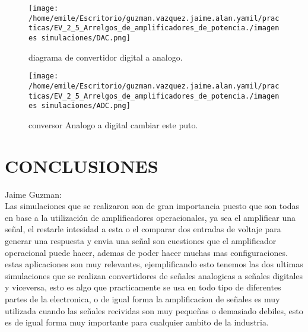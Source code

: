 \documentclass[13pt]{article}
\begin{document}
\begin{figure}[htp]
\centering
\texttt{[image: /home/emile/Escritorio/guzman.vazquez.jaime.alan.yamil/practicas/EV\_2\_5\_Arrelgos\_de\_amplificadores\_de\_potencia./imagenes simulaciones/DAC.png]}
\caption{diagrama de convertidor digital a analogo.}
\label{.}
\end{figure}


\begin{figure}[htp]
\centering
\texttt{[image: /home/emile/Escritorio/guzman.vazquez.jaime.alan.yamil/practicas/EV\_2\_5\_Arrelgos\_de\_amplificadores\_de\_potencia./imagenes simulaciones/ADC.png]}
\caption{conversor Analogo a digital cambiar este puto.}
\label{.}
\end{figure}






















\section{CONCLUSIONES}
Jaime Guzman:\\
Las simulaciones que se realizaron son de gran importancia puesto que son todas en base a la utilización de amplificadores operacionales, ya sea el amplificar una señal, el restarle intesidad  a esta o el comparar dos entradas de voltaje para generar una respuesta y envia una señal son cuestiones que el amplificador operacional puede hacer, ademas de poder hacer muchas mas configuraciones.\\ estas aplicaciones son muy relevantes, ejemplificando esto tenemos las dos ultimas simulaciones que se realizan convertidores de señales analogicas a señales digitales y viceversa, esto es algo que practicamente se usa  en todo tipo de diferentes partes de la electronica, o de igual forma la amplificacion de señales es muy utilizada cuando las señales recividas son muy pequeñas o demasiado debiles, esto es de igual forma muy importante para cualquier ambito de la industria.  
\end{document}
